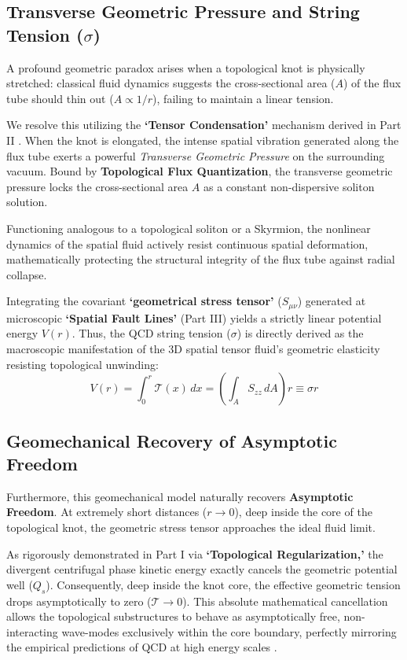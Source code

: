 \documentclass[reprint,amsmath,amssymb,aps,prd]{revtex4-2}
\begin{document}
\subsection{Transverse Geometric Pressure and String Tension ($\sigma$)}
A profound geometric paradox arises when a topological knot is physically stretched: classical fluid dynamics suggests the cross-sectional area ($A$) of the flux tube should thin out ($A \propto 1/r$), failing to maintain a linear tension.

We resolve this utilizing the \textbf{`Tensor Condensation'} mechanism derived in Part II \cite{YooPart2}. When the knot is elongated, the intense spatial vibration generated along the flux tube exerts a powerful \textit{Transverse Geometric Pressure} on the surrounding vacuum. Bound by \textbf{Topological Flux Quantization}, the transverse geometric pressure locks the cross-sectional area $A$ as a constant non-dispersive soliton solution. 

Functioning analogous to a topological soliton or a Skyrmion, the nonlinear dynamics of the spatial fluid actively resist continuous spatial deformation, mathematically protecting the structural integrity of the flux tube against radial collapse.

Integrating the covariant \textbf{`geometrical stress tensor'} ($S_{\mu\nu}$) generated at microscopic \textbf{`Spatial Fault Lines'} (Part III) \cite{YooPart3} yields a strictly linear potential energy $V(r)$. Thus, the QCD string tension ($\sigma$) \cite{Wilson1974} is directly derived as the macroscopic manifestation of the 3D spatial tensor fluid's geometric elasticity resisting topological unwinding:
\begin{equation}
V(r) = \int_{0}^{r} \mathcal{T}(x) \, dx = \left( \int_A S_{zz} \, dA \right) r \equiv \sigma r
\end{equation}

\subsection{Geomechanical Recovery of Asymptotic Freedom}
Furthermore, this geomechanical model naturally recovers \textbf{Asymptotic Freedom}. At extremely short distances ($r \to 0$), deep inside the core of the topological knot, the geometric stress tensor approaches the ideal fluid limit.

As rigorously demonstrated in Part I \cite{YooPart1} via \textbf{`Topological Regularization,'} the divergent centrifugal phase kinetic energy exactly cancels the geometric potential well ($Q_s$). Consequently, deep inside the knot core, the effective geometric tension drops asymptotically to zero ($\mathcal{T} \to 0$). This absolute mathematical cancellation allows the topological substructures to behave as asymptotically free, non-interacting wave-modes exclusively within the core boundary, perfectly mirroring the empirical predictions of QCD at high energy scales \cite{Gross1973}.
\end{document}
